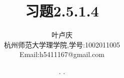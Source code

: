 \documentclass[a4paper, 12pt]{article} %
\makeatletter
\renewcommand{\maketitle}{ %
  \renewcommand\refname{参考文献}
  \newcommand{\D}{\displaystyle}\newcommand{\ri}{\Rightarrow}
  \newcommand{\ds}{\displaystyle} \renewcommand{\ni}{\noindent}
  \newcommand{\pa}{\partial} \newcommand{\Om}{\Omega}
  \newcommand{\om}{\omega} \newcommand{\sik}{\sum_{i=1}^k}
  \newcommand{\vov}{\Vert\omega\Vert} \newcommand{\Umy}{U_{\mu_i,y^i}}
  \newcommand{\lamns}{\lambda_n^{^{\scriptstyle\sigma}}}
  \newcommand{\chiomn}{\chi_{_{\Omega_n}}}
  \newcommand{\ullim}{\underline{\lim}} \newcommand{\bsy}{\boldsymbol}
  \newcommand{\mvb}{\mathversion{bold}} \newcommand{\la}{\lambda}
  \newcommand{\La}{\Lambda} \newcommand{\va}{\varepsilon}
  \newcommand{\be}{\beta} \newcommand{\al}{\alpha}
  \newcommand{\dis}{\displaystyle} \newcommand{\R}{{\mathbb R}}
  \newcommand{\N}{{\mathbb N}} \newcommand{\cF}{{\mathcal F}}
  \newcommand{\gB}{{\mathfrak B}} \newcommand{\eps}{\epsilon}
  \begin{flushright} %
    {\LARGE\@title} %
    
    \vspace{50pt} %
    
    {\large\@author} %
    \\\@date %
    
    \vspace{40pt} %
  \end{flushright}
}
\makeatother
\begin{document}
\title{\textbf{习题2.5.1.4}} 
\author{\small{叶卢庆}\\{\small{杭州师范大学理学院,学号:1002011005}}\\{\small{Email:h5411167@gmail.com}}} %
\renewcommand{\today}{\number\year. \number\month. \number\day}
\date{\today} %



\maketitle %






\end{document}
